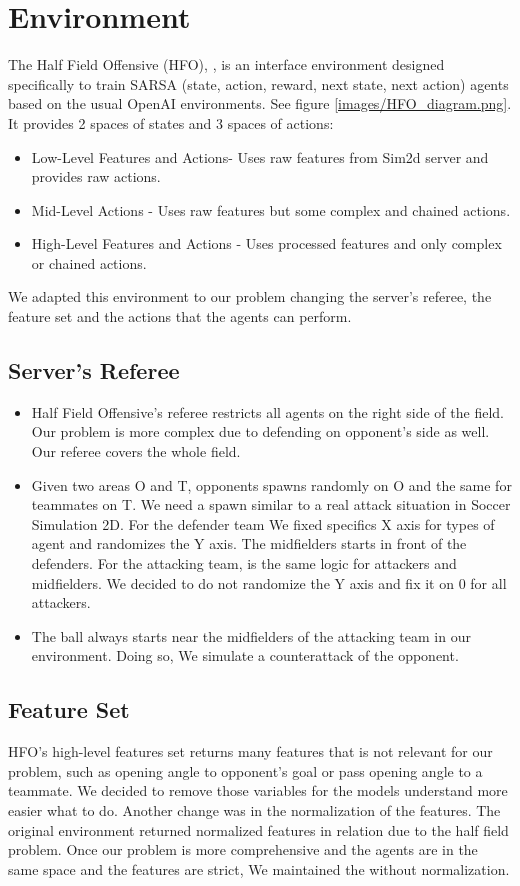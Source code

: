 \chapter{Environment}\label{chapter:environment}

The Half Field Offensive (HFO), \cite{hfo}, is an interface environment designed specifically to train SARSA (state, action, reward, next state, next action) agents based on the usual OpenAI environments. See figure \ref{images/HFO_diagram.png}. It provides 2 spaces of states and 3 spaces of actions:
\begin{itemize}
    \item Low-Level Features and Actions- Uses raw features from Sim2d server and provides raw actions.
    \item Mid-Level Actions - Uses raw features but some complex and chained actions.
    \item High-Level Features and Actions - Uses processed features and only complex or chained actions.
\end{itemize}
We adapted this environment to our problem changing the server's referee, the feature set and the actions that the agents can perform.

\section{Server's Referee}
\begin{itemize}
    \item Half Field Offensive's referee restricts all agents on the right side of the field. Our problem is more complex due to defending on opponent's side as well. Our referee covers the whole field.
    \item Given two areas O and T, opponents spawns randomly on O and the same for teammates on T. We need a spawn similar to a real attack situation in Soccer Simulation 2D. For the defender team We fixed specifics X axis for types of agent and randomizes the Y axis. The midfielders starts in front of the defenders. For the attacking team, is the same logic for attackers and midfielders. We decided to do not randomize the Y axis and fix it on 0 for all attackers.   
    \item The ball always starts near the midfielders of the attacking team in our environment. Doing so, We simulate a counterattack of the opponent.
\end{itemize}

\section{Feature Set}
HFO's high-level features set returns many features that is not relevant for our problem, such as opening angle to opponent's goal or pass opening angle to a teammate. We decided to remove those variables for the models understand more easier what to do. Another change was in the normalization of the features. The original environment returned normalized features in relation due to the half field problem. Once our problem is more comprehensive and the agents are in the same space and the features are strict, We maintained the without normalization. 

